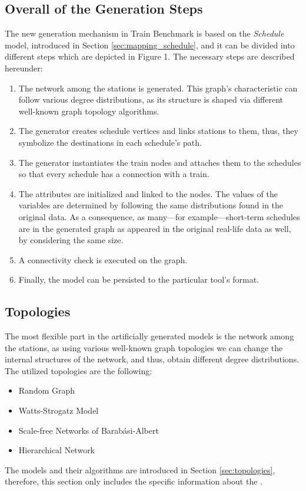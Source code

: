 \subsection{Overall of the Generation Steps}
The new generation mechanism in Train Benchmark is based on the \textit{Schedule} model, introduced in Section \ref{sec:mapping_schedule}, and it can be divided into different steps which are depicted in Figure 1. %
The necessary steps are described hereunder:
\begin{enumerate}
	\item The network among the stations is generated. This graph's characteristic can follow various degree distributions, as its structure is shaped via different well-known graph topology algorithms.
	\item The generator creates schedule vertices and links stations to them, thus, they symbolize the destinations in each schedule's path.
	\item The generator instantiates the train nodes and attaches them to the schedules so that every schedule has a connection with a train.
	\item The attributes are initialized and linked to the nodes. The values of the variables are determined by following the same distributions found in the original data. As a consequence, as many---for example---short-term schedules are in the generated graph as appeared in the original real-life data as well, by considering the same size.
	\item A connectivity check is executed on the graph.
	\item Finally, the model can be persisted to the particular tool's format.
\end{enumerate}

\subsection{Topologies}
The most flexible part in the artificially generated models is the network among the stations, as using various well-known graph topologies we can change the internal structures of the network, and thus, obtain different degree distributions. The utilized topologies are the following:
\begin{itemize}
	\item Random Graph
	\item Watts-Strogatz Model
	\item Scale-free Networks of Barabási-Albert
	\item Hierarchical Network
\end{itemize}
The models and their algorithms are introduced in Section \ref{sec:topologies}, therefore, this section only includes the specific information about the .

